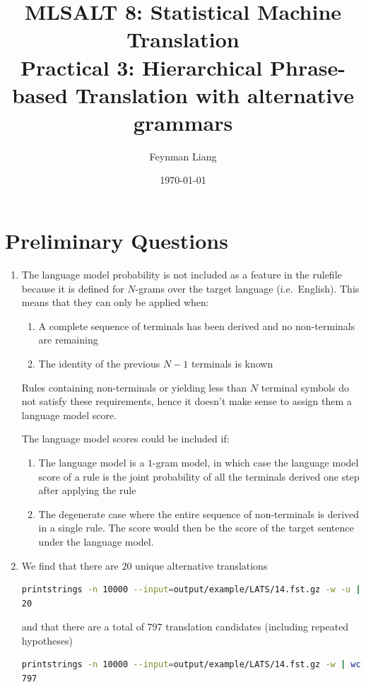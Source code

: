 \documentclass[a4paper,oneside,reqno]{amsart}
\newcommand{\authorname}{Feynman Liang}
\newcommand{\coursename}{MLSALT 8: Statistical Machine Translation}
\newcommand{\assignmentname}{Practical 3: Hierarchical Phrase-based Translation
with alternative grammars}
\begin{document}
\title{\coursename\\\assignmentname}

\author{\authorname}
\date{\today}

\maketitle

\section{Preliminary Questions}
\begin{enumerate}[label=\arabic*.]
  \item The language model probability is not included as a feature in the
    rulefile because it is defined for $N$-grams over the target language
    (i.e.\ English). This means that they can only be applied when:
    \begin{enumerate}
      \item A complete sequence of terminals has been derived and no
        non-terminals are remaining
      \item The identity of the previous $N-1$ terminals is known
    \end{enumerate}
    Rules containing non-terminals or yielding less than $N$ terminal symbols
    do not satisfy these requirements, hence it doesn't make sense to assign
    them a language model score.

    The language model scores could be included if:
    \begin{enumerate}
      \item The language model is a $1$-gram model, in which case the language
        model score of a rule is the joint probability of all the terminals
        derived one step after applying the rule
      \item The degenerate case where the entire sequence of non-terminals is
        derived in a single rule. The score would then be the score of the
        target sentence under the language model.
    \end{enumerate}

  \item We find that there are $20$ unique alternative translations
    \begin{lstlisting}[language=bash]
printstrings -n 10000 --input=output/example/LATS/14.fst.gz -w -u | wc -l
20
    \end{lstlisting}
    and that there are a total of 797 translation candidates (including repeated hypotheses)
    \begin{lstlisting}[language=bash]
printstrings -n 10000 --input=output/example/LATS/14.fst.gz -w | wc -l
797
    \end{lstlisting}


\end{enumerate}
\end{document}
